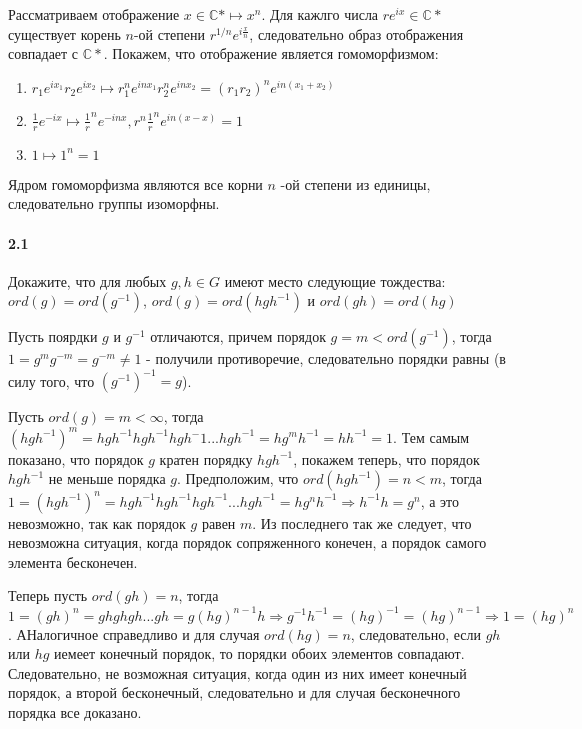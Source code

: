 \documentclass[a4paper,12pt]{article}
\begin{document}
\begin{Solution}
Рассматриваем отображение $x \in \mathbb{C}* \mapsto x^n$. Для кажлго числа $r e^{i x} \in \mathbb{C}*$ существует корень $n$-ой степени $r^{1/n} e^{i \frac{x}{n}}$, следовательно образ отображения совпадает с $\mathbb{C}*$. Покажем, что отображение является гомоморфизмом:
\begin{enumerate}
\item $r_1 e^{ix_1} r_2 e^{ix_2} \mapsto r_1^n e^{i n x_1} r_2^n e^{i n x_2} = \left(r_1r_2\right)^n e^{i n \left(x_1 + x_2\right)}$

\item $\frac{1}{r} e^{-ix} \mapsto {\frac{1}{r}}^n e^{- i n x}, r^n {\frac{1}{r}}^n e^{i n \left(x - x\right)} = 1$

\item $1 \mapsto 1^n = 1$
\end{enumerate}
Ядром гомоморфизма являются все корни $n$ -ой степени из единицы, следовательно группы изоморфны.
\end{Solution}

\paragraph{2.1} Докажите, что для любых $g, h \in G$ имеют место следующие тождества: $ord(g) = ord(g^{-1})$, $ord(g) = ord(hgh^{-1})$ и $ord(gh) = ord(hg)$

\begin{Solution}
Пусть поярдки $g$ и $g^{-1}$ отличаются, причем порядок $g = m < ord(g^{-1})$, тогда $1 = g^mg^{-m} = g^{-m} \not= 1$ - получили противоречие, следовательно порядки равны (в силу того, что $(g^{-1})^{-1} = g$).

Пусть $ord(g) = m < \infty$, тогда $(hgh^{-1})^m = hgh^{-1}hgh^{-1}hgh{^-1}... hgh^{-1} = h g^m h^{-1} = h h^{-1} = 1$. Тем самым показано, что порядок $g$ кратен порядку $hgh^{-1}$, покажем теперь, что порядок $hgh^{-1}$ не меньше порядка $g$. Предположим, что $ord(hgh^{-1}) = n < m$, тогда $1 = (hgh^{-1})^n = hgh^{-1}hgh^{-1}hgh^{-1}...hgh^{-1} = hg^nh^{-1} \Rightarrow h^{-1}h = g^n$, а это невозможно, так как порядок $g$ равен $m$. Из последнего так же следует, что невозможна ситуация, когда порядок сопряженного конечен, а порядок самого элемента бесконечен.

Теперь пусть $ord(gh) = n$, тогда $1 = (gh)^n = ghghgh...gh = g (hg)^{n-1} h \Rightarrow g^{-1}h^{-1} = (hg)^{-1} = (hg)^{n-1} \Rightarrow 1 = (hg)^n$. АНалогичное справедливо и для случая $ord(hg) = n$, следовательно, если $gh$ или $hg$ иемеет конечный порядок, то порядки обоих элементов совпадают. Следовательно, не возможная ситуация, когда один из них имеет конечный порядок, а второй бесконечный, следовательно и для случая бесконечного порядка все доказано.
\end{Solution}
\end{document}
